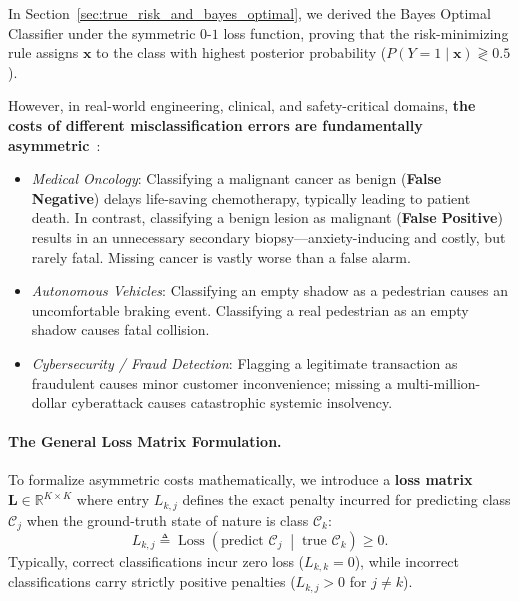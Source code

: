 In Section~\ref{sec:true_risk_and_bayes_optimal}, we derived the Bayes Optimal Classifier under the symmetric $0$-$1$ loss function, proving that the risk-minimizing rule assigns $\mathbf{x}$ to the class with highest posterior probability ($P(Y=1 \mid \mathbf{x}) \gtrless 0.5$). 

However, in real-world engineering, clinical, and safety-critical domains, \textbf{the costs of different misclassification errors are fundamentally asymmetric}~\cite{bishop2024deep}:
\begin{itemize}[noitemsep]
  \item \emph{Medical Oncology}: Classifying a malignant cancer as benign (\textbf{False Negative}) delays life-saving chemotherapy, typically leading to patient death. In contrast, classifying a benign lesion as malignant (\textbf{False Positive}) results in an unnecessary secondary biopsy—anxiety-inducing and costly, but rarely fatal. Missing cancer is vastly worse than a false alarm.
  \item \emph{Autonomous Vehicles}: Classifying an empty shadow as a pedestrian causes an uncomfortable braking event. Classifying a real pedestrian as an empty shadow causes fatal collision.
  \item \emph{Cybersecurity / Fraud Detection}: Flagging a legitimate transaction as fraudulent causes minor customer inconvenience; missing a multi-million-dollar cyberattack causes catastrophic systemic insolvency.
\end{itemize}

\paragraph{The General Loss Matrix Formulation.}
To formalize asymmetric costs mathematically, we introduce a \textbf{loss matrix} $\mathbf{L} \in \mathbb{R}^{K \times K}$ where entry $L_{k, j}$ defines the exact penalty incurred for predicting class $\mathcal{C}_j$ when the ground-truth state of nature is class $\mathcal{C}_k$:
\begin{equation}
L_{k, j} \triangleq \operatorname{Loss}\left( \text{predict } \mathcal{C}_j \;\middle|\; \text{true } \mathcal{C}_k \right) \ge 0.
\label{eq:loss_matrix_def}
\end{equation}
Typically, correct classifications incur zero loss ($L_{k, k} = 0$), while incorrect classifications carry strictly positive penalties ($L_{k, j} > 0$ for $j \ne k$).

